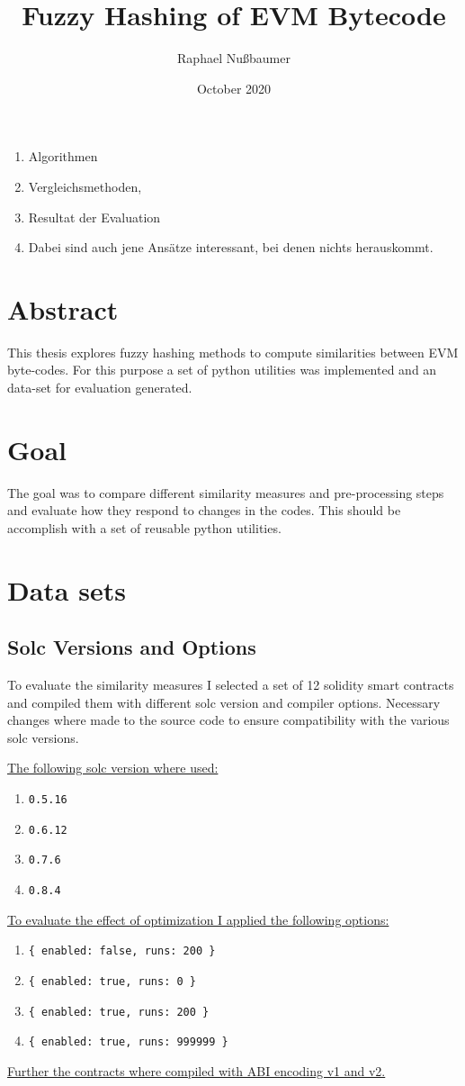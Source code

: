 \documentclass{article}
\title{Fuzzy Hashing of EVM Bytecode}
\author{Raphael Nußbaumer}
\date{October 2020}
\newcommand{\code}[1]{\mbox{\texttt{\footnotesize{#1}}}}
\newenvironment{ol}
{ \begin{enumerate}
  \setlength{\itemsep}{0pt}
  \setlength{\parskip}{0pt}
  \setlength{\parsep}{0pt}
}{ \end{enumerate} }
\begin{document}
\maketitle

\begin{ol}
\item Algorithmen
\item Vergleichsmethoden,
\item Resultat der Evaluation
\item Dabei sind auch jene Ansätze interessant, bei denen nichts herauskommt.
\end{ol}

\section{Abstract}
This thesis explores fuzzy hashing methods to compute similarities between EVM byte-codes.
For this purpose a set of python utilities was implemented and an data-set for evaluation generated.

\section{Goal}
The goal was to compare different similarity measures and pre-processing steps and evaluate how
they respond to changes in the codes.
This should be accomplish with a set of reusable python utilities.

\section{Data sets}
\subsection{Solc Versions and Options}
To evaluate the similarity measures I selected a set of 12 solidity smart contracts and compiled
them with different solc version and compiler options.
Necessary changes where made to the source code to ensure compatibility with the various solc
versions.

\underline{The following solc version where used:}
\begin{ol}
  \item \code{0.5.16}
  \item \code{0.6.12}
  \item \code{0.7.6}
  \item \code{0.8.4}
\end{ol}
\underline{To evaluate the effect of optimization I applied the following options:}
\begin{ol}
  \item \code{\{ enabled: false, runs: 200 \}}
  \item \code{\{ enabled: true, runs: 0 \}}
  \item \code{\{ enabled: true, runs: 200 \}}
  \item \code{\{ enabled: true, runs: 999999 \}}
\end{ol}
\underline{Further the contracts where compiled with ABI encoding v1 and v2.}
\end{document}
